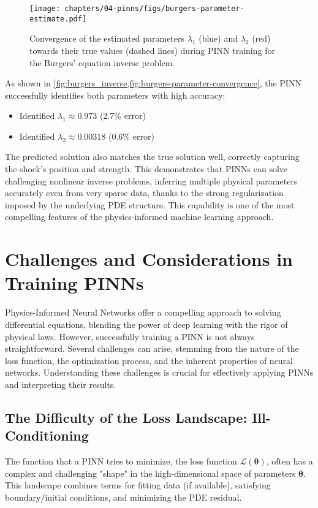 \begin{figure}[htbp]
    \centering
    \texttt{[image: chapters/04-pinns/figs/burgers-parameter-estimate.pdf]}
    \caption{Convergence of the estimated parameters $\lambda_1$ (blue) and $\lambda_2$ (red) towards their true values (dashed lines) during PINN training for the Burgers' equation inverse problem.}
    \label{fig:burgers-parameter-convergence}
\end{figure}

As shown in \cref{fig:burgers_inverse,fig:burgers-parameter-convergence}, the PINN successfully identifies both parameters with high accuracy:
\begin{itemize}
    \item Identified $\lambda_1 \approx 0.973$ (2.7\% error)
    \item Identified $\lambda_2 \approx 0.00318$ (0.6\% error)
\end{itemize}
The predicted solution also matches the true solution well, correctly capturing the shock's position and strength. This demonstrates that PINNs can solve challenging nonlinear inverse problems, inferring multiple physical parameters accurately even from very sparse data, thanks to the strong regularization imposed by the underlying PDE structure. This capability is one of the most compelling features of the physics-informed machine learning approach.


\section{Challenges and Considerations in Training PINNs}
\label{sec:challenges}

Physics-Informed Neural Networks offer a compelling approach to solving differential equations, blending the power of deep learning with the rigor of physical laws. However, successfully training a PINN is not always straightforward. Several challenges can arise, stemming from the nature of the loss function, the optimization process, and the inherent properties of neural networks. Understanding these challenges is crucial for effectively applying PINNs and interpreting their results.

\subsection{The Difficulty of the Loss Landscape: Ill-Conditioning}

The function that a PINN tries to minimize, the loss function $\mathcal{L}(\boldsymbol{\theta})$, often has a complex and challenging "shape" in the high-dimensional space of parameters $\boldsymbol{\theta}$. This landscape combines terms for fitting data (if available), satisfying boundary/initial conditions, and minimizing the PDE residual.

